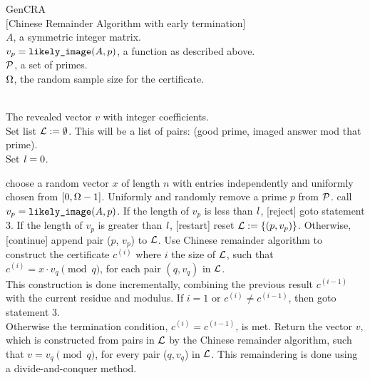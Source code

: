 \begin{algorithm} {GenCRA}\\
$[$Chinese Remainder Algorithm with early termination] 
\Inspec\\
  $A$, a symmetric integer matrix.\\
  $v_p = \mbox{\tt likely\_image}(A, p)$, a function as described above.\\
  $\mathcal P$, a set of primes.\\  %
  $\Omega$, the random sample size for the certificate.

\Outspec\\
The revealed vector $v$ with integer coefficients. \\
\Stmt[1.]
Set list $\mathcal L := \emptyset$.  This will be a list of pairs: (good prime, imaged answer
 mod that prime).\\
Set $\mathit l = 0$.

\Stmt[2.]
choose a random vector $x$ of length $n$ with
entries independently and uniformly chosen 
from $[0, \Omega - 1]$.
\Stmt[3.]
Uniformly and randomly remove a prime $p$ from $\mathcal P$.
\Stmt[4.]
call $v_p = \mbox{\tt likely\_image}(A, p)$. 
If the length of $v_p$ is less than $\mathit l$, [reject] goto statement 3.
If the length of $v_p$ is greater than $\mathit l$, [restart] reset $\mathcal L := \{(p, v_p)\}$.
Otherwise, [continue] append pair ($p$, $v_p$) to $\mathcal L$.
\Stmt[5.]
Use Chinese remainder algorithm to construct 
the certificate $c^{(i)}$ where $i$ the size of $\mathcal L$, such that
$c^{(i)} = x \cdot v_{q} \pmod {q}$, for each pair $(q, v_q)$ in $\mathcal L$.\\
This construction is done incrementally, combining the previous result $c^{(i-1)}$ 
with the current residue and modulus.
\Stmt[6.]
If $i = 1$ or $c^{(i)} \not= c^{(i-1)}$, then goto statement 3.\\
Otherwise the termination condition, $c^{(i)} = c^{(i-1)}$,
is met.
Return the vector $v$, which is
constructed from pairs in $\mathcal L$ by the Chinese remainder algorithm,
such that $v = v_q \pmod q$, for every pair ($q, v_q$) in $\mathcal L$.
This remaindering is done using a divide-and-conquer method. 
\end{algorithm}

